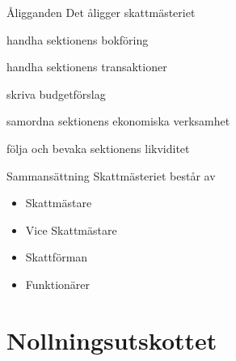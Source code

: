 \documentclass[pdfbookmarks,a4paper,11pt]{article}
\newlength{\itemcollength}
\newenvironment{reglemlista}{%
  \begin{list}{}{%
      \setlength{\labelwidth}{\itemcollength}%
      \setlength{\leftmargin}{\labelwidth + \labelsep}%
      \renewcommand{\makelabel}[1]{%
        \raisebox{0pt}[1ex][0pt]{%
          \makebox[\labelwidth][l]{%
            \parbox[t]{\itemcollength}{%
              \raggedright\hspace{0pt}##1}}}\hfill}%
      }}{%
  \end{list}}
\begin{document}
\begin{reglemlista}

	\item[Åligganden]
	Det åligger skattmästeriet
	\begin{attlista}
		\item handha sektionens bokföring
		\item handha sektionens transaktioner
		\item skriva budgetförslag
		\item samordna sektionens ekonomiska verksamhet
		\item följa och bevaka sektionens likviditet
	\end{attlista}

	\item[Sammansättning]
	Skattmästeriet består av
	\begin{itemize}
		\item Skattmästare
		\item Vice Skattmästare
		\item Skattförman
		\item Funktionärer
	\end{itemize}
\end{reglemlista}

\section{Nollningsutskottet}
\end{document}
